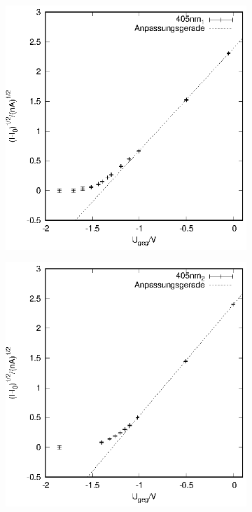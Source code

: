 \begin{figure}
  \begin{subfigure}[h]{0.49\textwidth}
    \centering
    \includegraphics{data/Messung_photoeffekt/405nm_1.eps}
  \end{subfigure}
  \begin{subfigure}[h]{0.49\textwidth}
    \centering
    \includegraphics{data/Messung_photoeffekt/405nm_2.eps}

\end{subfigure}
\end{figure}
